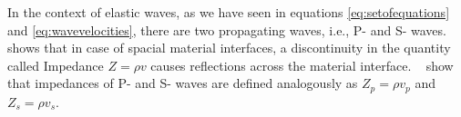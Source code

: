 In the context of elastic waves, as we have seen in equations \ref{eq:setofequations} and \ref{eq:wavevelocities}, there are two propagating waves, i.e., P- and S- waves. 
~\parencite[Sec 9.6-Sec 9.8]{leveque_2002} shows that in case of spacial material interfaces, a discontinuity in the quantity called Impedance $Z = \rho v$
causes reflections across the material interface. ~\parencite[Eq. 1.66 and 1.180]{kaufman} show that impedances of P- and S- waves are defined analogously as
$Z_p = \rho v_p$ and $Z_s = \rho v_s$.
